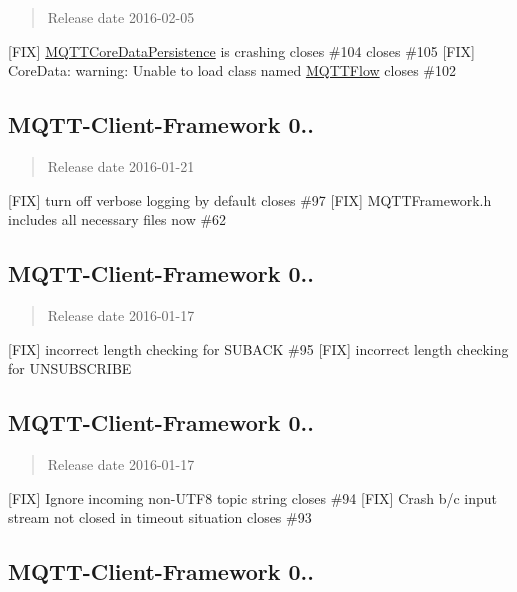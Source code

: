 \begin{quote}
Release date 2016-\/02-\/05 \end{quote}


\mbox{[}F\+IX\mbox{]} \hyperlink{interface_m_q_t_t_core_data_persistence}{M\+Q\+T\+T\+Core\+Data\+Persistence} is crashing closes \#104 closes \#105 \mbox{[}F\+IX\mbox{]} Core\+Data\+: warning\+: Unable to load class named \textquotesingle{}\hyperlink{interface_m_q_t_t_flow}{M\+Q\+T\+T\+Flow}\textquotesingle{} closes \#102

\subsection*{M\+Q\+T\+T-\/\+Client-\/\+Framework 0..}

\begin{quote}
Release date 2016-\/01-\/21 \end{quote}


\mbox{[}F\+IX\mbox{]} turn off verbose logging by default closes \#97 \mbox{[}F\+IX\mbox{]} M\+Q\+T\+T\+Framework.\+h includes all necessary files now \#62

\subsection*{M\+Q\+T\+T-\/\+Client-\/\+Framework 0..}

\begin{quote}
Release date 2016-\/01-\/17 \end{quote}


\mbox{[}F\+IX\mbox{]} incorrect length checking for S\+U\+B\+A\+CK \#95 \mbox{[}F\+IX\mbox{]} incorrect length checking for U\+N\+S\+U\+B\+S\+C\+R\+I\+BE

\subsection*{M\+Q\+T\+T-\/\+Client-\/\+Framework 0..}

\begin{quote}
Release date 2016-\/01-\/17 \end{quote}


\mbox{[}F\+IX\mbox{]} Ignore incoming non-\/\+U\+T\+F8 topic string closes \#94 \mbox{[}F\+IX\mbox{]} Crash b/c input stream not closed in timeout situation closes \#93

\subsection*{M\+Q\+T\+T-\/\+Client-\/\+Framework 0..}

